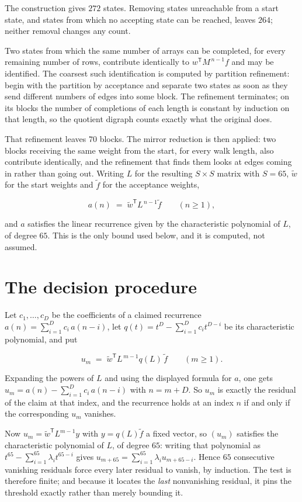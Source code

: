 \documentclass[11pt]{article}
\theoremstyle{definition}
\begin{document}
The construction gives $272$ states. Removing states unreachable from a start state, and states from which no accepting state can be reached, leaves $264$; neither removal changes any count.

Two states from which the same number of arrays can be completed, for every remaining number of rows, contribute identically to $w^{\mathsf T}M^{\,n-1}f$ and may be identified. The coarsest such identification is computed by partition refinement: begin with the partition by acceptance and separate two states as soon as they send different numbers of edges into some block. The refinement terminates; on its blocks the number of completions of each length is constant by induction on that length, so the quotient digraph counts exactly what the original does.

That refinement leaves $70$ blocks. The mirror reduction is then applied: two blocks receiving the same weight from the start, for every walk length, also contribute identically, and the refinement that finds them looks at edges coming in rather than going out. Writing $L$ for the resulting $S \times S$ matrix with $S = 65$, $\tilde w$ for the start weights and $\tilde f$ for the acceptance weights,

\[a(n) \;=\; \tilde w^{\mathsf T} L^{\,n-1} \tilde f \qquad (n \ge 1),\]

and $a$ satisfies the linear recurrence given by the characteristic polynomial of $L$, of degree $65$. This is the only bound used below, and it is computed, not assumed.

\section{The decision procedure}

Let $c_1,\dots,c_D$ be the coefficients of a claimed recurrence $a(n) = \sum_{i=1}^{D} c_i\,a(n-i)$, let $q(t) = t^{D} - \sum_{i=1}^{D} c_i t^{D-i}$ be its characteristic polynomial, and put

\[u_m \;=\; \tilde w^{\mathsf T} L^{\,m-1} q(L)\,\tilde f \qquad (m \ge 1).\]

Expanding the powers of $L$ and using the displayed formula for $a$, one gets $u_m = a(n) - \sum_{i=1}^{D} c_i\,a(n-i)$ with $n = m + D$. So $u_m$ is exactly the residual of the claim at that index, and the recurrence holds at an index $n$ if and only if the corresponding $u_m$ vanishes.

Now $u_m = \tilde w^{\mathsf T} L^{m-1} y$ with $y = q(L)\tilde f$ a fixed vector, so $(u_m)$ satisfies the characteristic polynomial of $L$, of degree $65$: writing that polynomial as $t^{65} - \sum_{i=1}^{65} \lambda_i t^{65-i}$ gives $u_{m+65} = \sum_{i=1}^{65} \lambda_i u_{m+65-i}$. Hence $65$ consecutive vanishing residuals force every later residual to vanish, by induction. The test is therefore finite; and because it locates the {\itshape last} nonvanishing residual, it pins the threshold exactly rather than merely bounding it.
\end{document}
